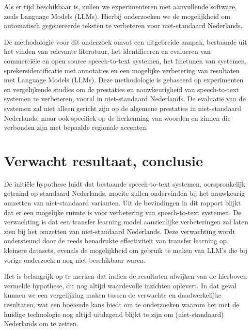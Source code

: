 \par Als er tijd beschikbaar is, zullen we experimenteren met aanvullende software, zoals Language Models (LLMs). Hierbij onderzoeken we de mogelijkheid om automatisch gegenereerde teksten te verbeteren voor niet-standaard Nederlands.


\par De methodologie voor dit onderzoek omvat een uitgebreide aanpak, bestaande uit het vinden van relevante literatuur, het identificeren en evalueren van commerciële en open source speech-to-text systemen, het finetunen van systemen, sprekersidentificatie met annotaties en een mogelijke verbetering van resultaten met Language Models (LLMs). Deze methodologie is gebaseerd op experimenten en vergelijkende studies om de prestaties en nauwkeurigheid van speech-to-text systemen te verbeteren, vooral in niet-standaard Nederlands. De evaluatie van de systemen zal niet alleen gericht zijn op de algemene prestaties in niet-standaard Nederlands, maar ook specifiek op de herkenning van woorden en zinnen die verbonden zijn met bepaalde regionale accenten.

\section{Verwacht resultaat, conclusie}%
\label{sec:verwachte_resultaten}

De initiële hypothese luidt dat bestaande speech-to-text systemen, oorspronkelijk getraind op standaard Nederlands, moeite zullen ondervinden bij het nauwkeurig omzetten van niet-standaard varianten.
Uit de bevindingen in dit rapport blijkt dat er een mogelijke ruimte is voor verbetering van speech-to-text systemen. De verwachting is dat een transfer learning model aanzienlijke verbeteringen zal laten zien bij het omzetten van niet-standaard Nederlands. Deze verwachting wordt ondersteund door de reeds benadrukte effectiviteit van transfer learning op kleinere datasets, evenals de mogelijkheid om gebruik te maken van LLM's die bij vorige onderzoeken nog niet beschikbaar waren.

Het is belangrijk op te merken dat indien de resultaten afwijken van de hierboven vermelde hypothese, dit nog altijd waardevolle inzichten oplevert. In dat geval kunnen we een vergelijking maken tussen de verwachte en daadwerkelijke resultaten, wat een boeiende kans biedt om te onderzoeken waarom het met de huidige technologie nog altijd uitdagend blijkt te zijn om (niet-standaard) Nederlands om te zetten.
